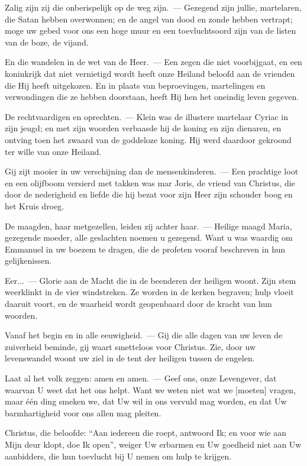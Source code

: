\documentclass[12pt,twoside,a5paper]{article}
\begin{document}
\begin{halfparskip}
  Zalig zijn zij die onberispelijk op de weg zijn.~--- Gezegend zijn jullie, martelaren, die Satan hebben overwonnen; en de angel van dood en zonde hebben vertrapt; moge uw gebed voor ons een hoge muur en een toevluchtsoord zijn van de listen van de boze, de vijand.

  En die wandelen in de wet van de Heer.~--- Een zegen die niet voorbijgaat, en een koninkrijk dat niet vernietigd wordt heeft onze Heiland beloofd aan de vrienden die Hij heeft uitgekozen. En in plaats van beproevingen, martelingen en verwondingen die ze hebben doorstaan, heeft Hij hen het oneindig leven gegeven.

  De rechtvaardigen en oprechten.~--- Klein was de illustere martelaar Cyriac in zijn jeugd; en met zijn woorden verbaasde hij de koning en zijn dienaren, en ontving toen het zwaard van de goddeloze koning. Hij werd daardoor gekroond ter wille van onze Heiland.

  Gij zijt mooier in uw verschijning dan de mensenkinderen.~--- Een prachtige loot en een olijfboom versierd met takken was mar Joris, de vriend van Christus, die door de nederigheid en liefde die hij bezat voor zijn Heer zijn schouder boog en het Kruis droeg.

  De maagden, haar metgezellen, leiden zij achter haar.~--- Heilige maagd Maria, gezegende moeder, alle geslachten noemen u gezegend. Want u was waardig om Emmanuel in uw boezem te dragen, die de profeten vooraf beschreven in hun gelijkenissen.

  Eer...~--- Glorie aan de Macht die in de beenderen der heiligen woont. Zijn stem weerklinkt in de vier windstreken. Ze worden in de kerken begraven; hulp vloeit daaruit voort, en de waarheid wordt geopenbaard door de kracht van hun woorden.

  Vanaf het begin en in alle eeuwigheid.~--- Gij die alle dagen van uw leven de zuiverheid beminde, gij waart smetteloos voor Christus. Zie, door uw levenswandel woont uw ziel in de tent der heiligen tussen de engelen.

  Laat al het volk zeggen: amen en amen.~--- Geef ons, onze Levengever, dat waarvan U weet dat het ons helpt. Want we weten niet wat we [moeten] vragen, maar één ding smeken we, dat Uw wil in ons vervuld mag worden, en dat Uw barmhartigheid voor ons allen mag pleiten.

  Christus, die beloofde: ``Aan iedereen die roept, antwoord Ik; en voor wie aan Mijn deur klopt, doe Ik open'', weiger Uw erbarmen en Uw goedheid niet aan Uw aanbidders, die hun toevlucht bij U nemen om hulp te krijgen.
\end{halfparskip}
\end{document}
